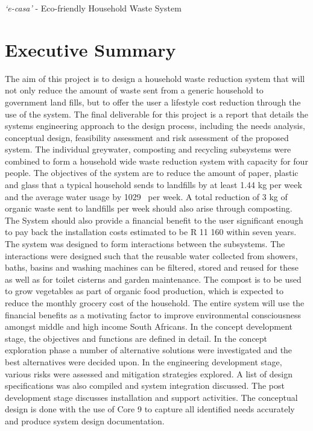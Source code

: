 \documentclass[a4paper,11pt,fleqn]{report}
\begin{document}

\textit{`e-casa'} - Eco-friendly Household Waste System

\chapter*{Executive Summary}
The aim of this project is to design a household waste reduction system that will not only reduce the amount of waste sent from a generic household to government land fills, but to offer the user a lifestyle cost reduction through the use of the system. The final deliverable for this project is a report that details the systems engineering approach to the design process, including the needs analysis, conceptual design, feasibility assessment and risk assessment of the proposed system. The individual greywater, composting and recycling subsystems were combined to form a household wide waste reduction system with capacity for four people. The objectives of the system are to reduce the amount of paper, plastic and glass that a typical household sends to landfills by at least 1.44 kg per week and the average water usage by 1029~ per week. A total reduction of 3 kg of organic waste sent to landfills per week should also arise through composting.  The System should also provide a financial benefit to the user significant enough to pay back the installation costs  estimated to be R 11 160 within seven years. 
The system was designed to form interactions between the subsystems. The interactions were designed such that the reusable water collected from showers, baths, basins and washing machines can be filtered, stored and reused for these as well as for toilet cisterns and garden maintenance. The compost is to be used to grow vegetables as part of organic food production, which is expected to reduce the monthly grocery cost of the household. The entire system will use the financial benefits as a motivating factor to improve environmental consciousness amongst middle and high income South Africans.
In the concept development stage, the objectives and functions are defined in detail. In the concept exploration phase a number of alternative solutions were investigated and the best alternatives were decided upon. In the engineering development stage, various risks were assessed and mitigation strategies explored. A list of design specifications was also compiled and system integration discussed. The post development stage discusses installation and support activities. The conceptual design is done with the use of Core 9 to capture all identified needs accurately and produce system design documentation.
\end{document}
